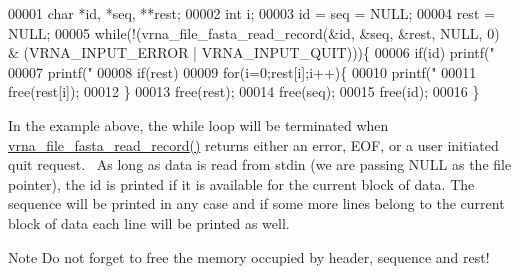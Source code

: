 \begin{DoxyCode}
00001 char *id, *seq, **rest;
00002 int  i;
00003 id = seq = NULL;
00004 rest = NULL;
00005 while(!(vrna\_file\_fasta\_read\_record(&id, &seq, &rest, NULL, 0) & (VRNA\_INPUT\_ERROR |
       VRNA\_INPUT\_QUIT)))\{
00006   if(id) printf("%
00007   printf("%
00008   if(rest)
00009     for(i=0;rest[i];i++)\{
00010       printf("%
00011       free(rest[i]);
00012     \}
00013   free(rest);
00014   free(seq);
00015   free(id);
00016 \}
\end{DoxyCode}
 In the example above, the while loop will be terminated when \hyperlink{group__file__utils_ga8cfb7e271efc9e1f34640acb85475639}{vrna\+\_\+file\+\_\+fasta\+\_\+read\+\_\+record()} returns either an error, E\+O\+F, or a user initiated quit request.~\newline
 As long as data is read from stdin (we are passing N\+U\+L\+L as the file pointer), the id is printed if it is available for the current block of data. The sequence will be printed in any case and if some more lines belong to the current block of data each line will be printed as well.

\begin{DoxyNote}{Note}
Do not forget to free the memory occupied by header, sequence and rest!
\end{DoxyNote}

